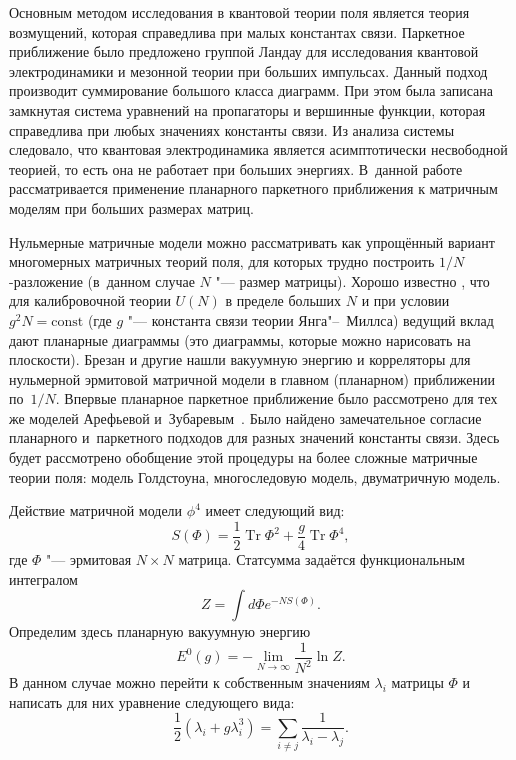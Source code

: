  Основным методом исследования в квантовой теории поля является теория возмущений, которая справедлива при
малых константах связи. Паркетное приближение было предложено группой Ландау  для исследования квантовой электродинамики и
мезонной теории при больших импульсах. Данный подход производит суммирование большого класса диаграмм. При этом была записана
замкнутая система уравнений на пропагаторы и вершинные функции, которая справедлива при любых значениях константы связи. Из
анализа системы следовало, что квантовая электродинамика является  асимптотически несвободной теорией, то есть она не работает при больших энергиях. В~данной работе рассматривается применение планарного паркетного приближения к матричным моделям при больших размерах матриц.

Нульмерные матричные модели можно рассматривать как упрощённый вариант многомерных матричных теорий поля, для которых трудно
построить $1/N$-разложение (в~данном случае $N$ "--- размер матрицы). 
Хорошо известно \cite{shish:hooft}, что для калибровочной теории $U(N)$ в пределе больших $N$ и при условии $g^2N=\text{const}$ 
(где $g$ "--- константа связи теории Янга"--~Миллса) ведущий вклад дают планарные диаграммы (это диаграммы, которые можно нарисовать на плоскости). 
Брезан и другие \cite{shish:bipz} нашли вакуумную энергию и корреляторы для нульмерной эрмитовой матричной модели в главном (планарном) приближении по~$1/N$.
Впервые планарное паркетное приближение было рассмотрено для тех же моделей Арефьевой и~Зубаревым~\cite{shish:az}. 
Было найдено замечательное согласие планарного и~паркетного подходов для разных значений константы связи. 
Здесь будет рассмотрено обобщение этой процедуры на более сложные матричные теории поля: модель Голдстоуна, многоследовую модель, двуматричную модель.

\smallskip
{} Действие  матричной модели $\phi^4$ \cite{shish:bipz} имеет следующий вид:
\begin{equation*}
S(\Phi)=\frac{1}{2}\mathop{\mathrm{Tr}}\nolimits   \Phi^2+\frac{g}{4}\mathop{\mathrm{Tr}}\nolimits  \Phi^4,
\end{equation*}
где $\Phi$ "--- эрмитовая $N\times N$ матрица.
Статсумма задаётся функциональным интегралом 
\begin{equation*}
Z= \int d \Phi e^{-NS(\Phi)}.
\end{equation*}
Определим здесь планарную вакуумную энергию
\begin{equation*}
E^0(g)=-\lim_{N \to \infty}\frac{1}{N^2}\ln Z.
\end{equation*}
В данном случае можно перейти к собственным значениям $\lambda_i$ матрицы $\Phi$ и написать для них уравнение  следующего вида:
\begin{equation} \label{shish:eq4}
\frac{1}{2}\left(\lambda_i+g\lambda_i^3 \right)=\sum_{i\ne j}\frac{1}{\lambda_i-\lambda_j}.
\end{equation}

